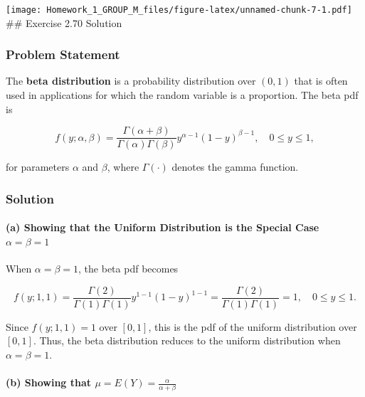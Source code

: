 \documentclass[
]{article}
\begin{document}
\texttt{[image: Homework\_1\_GROUP\_M\_files/figure-latex/unnamed-chunk-7-1.pdf]}
\#\# Exercise 2.70 Solution

\hypertarget{problem-statement-6}{%
\subsubsection{Problem Statement}\label{problem-statement-6}}

The \textbf{beta distribution} is a probability distribution over
\((0, 1)\) that is often used in applications for which the random
variable is a proportion. The beta pdf is

\[
f(y; \alpha, \beta) = \frac{\Gamma(\alpha + \beta)}{\Gamma(\alpha)\Gamma(\beta)} y^{\alpha - 1}(1 - y)^{\beta - 1}, \quad 0 \leq y \leq 1,
\]

for parameters \(\alpha\) and \(\beta\), where \(\Gamma(\cdot)\) denotes
the gamma function.

\hypertarget{solution-6}{%
\subsubsection{Solution}\label{solution-6}}

\hypertarget{a-showing-that-the-uniform-distribution-is-the-special-case-alpha-beta-1}{%
\paragraph{\texorpdfstring{(a) Showing that the Uniform Distribution is
the Special Case
\(\alpha = \beta = 1\)}{(a) Showing that the Uniform Distribution is the Special Case \textbackslash alpha = \textbackslash beta = 1}}\label{a-showing-that-the-uniform-distribution-is-the-special-case-alpha-beta-1}}

When \(\alpha = \beta = 1\), the beta pdf becomes

\[
f(y; 1, 1) = \frac{\Gamma(2)}{\Gamma(1)\Gamma(1)} y^{1 - 1}(1 - y)^{1 - 1} = \frac{\Gamma(2)}{\Gamma(1)\Gamma(1)} = 1, \quad 0 \leq y \leq 1.
\]

Since \(f(y; 1, 1) = 1\) over \([0, 1]\), this is the pdf of the uniform
distribution over \([0, 1]\). Thus, the beta distribution reduces to the
uniform distribution when \(\alpha = \beta = 1\).

\hypertarget{b-showing-that-mu-ey-fracalphaalpha-beta}{%
\paragraph{\texorpdfstring{(b) Showing that
\(\mu = E(Y) = \frac{\alpha}{\alpha + \beta}\)}{(b) Showing that \textbackslash mu = E(Y) = \textbackslash frac\{\textbackslash alpha\}\{\textbackslash alpha + \textbackslash beta\}}}\label{b-showing-that-mu-ey-fracalphaalpha-beta}}
\end{document}
